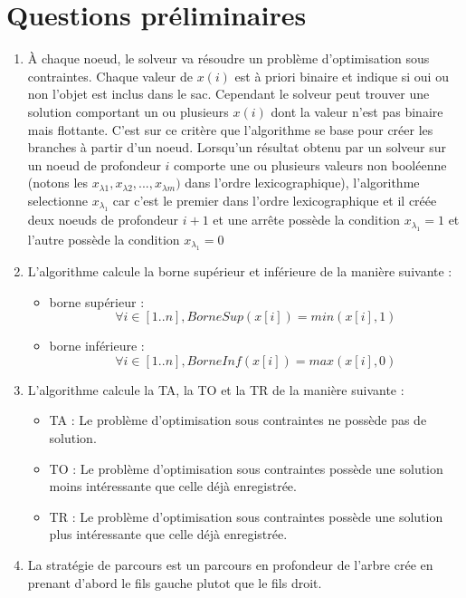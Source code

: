 \section {Questions préliminaires}
\begin{enumerate}
    \item
          À chaque noeud, le solveur va résoudre un problème d'optimisation sous contraintes.
          Chaque valeur de  $x(i)$ est à priori binaire et indique si oui ou non l'objet est inclus dans le sac.
          Cependant le solveur peut trouver une solution comportant un ou plusieurs $x(i)$ dont la valeur n'est pas binaire mais flottante.
          C'est sur ce critère que l'algorithme se base pour créer les branches à partir d'un noeud.
          Lorsqu'un résultat obtenu par un solveur sur un noeud de profondeur $i$ comporte une ou plusieurs valeurs non booléenne (notons les $x_{\lambda1},x_{\lambda2},...,x_{\lambda m})$ dans l'ordre lexicographique),
          l'algorithme selectionne $x_{\lambda_1}$ car c'est le premier dans l'ordre lexicographique et
          il créée deux noeuds de profondeur $i+1$ et une arrête possède la condition  $x_{\lambda_1} = 1$ et l'autre possède la condition $x_{\lambda_1} = 0$

    \item
          L'algorithme calcule la borne supérieur et inférieure de la manière suivante :

          \begin{itemize}
              \item borne supérieur :
                    $$ \forall i \in  [1..n], BorneSup(x[i]) = min(x[i],1)$$
              \item borne inférieure :
                    $$ \forall i \in  [1..n], BorneInf(x[i]) = max(x[i],0)$$
          \end{itemize}

    \item
          L'algorithme calcule la TA, la TO et la TR de la manière suivante :

          \begin{itemize}
              \item TA : Le problème d'optimisation sous contraintes ne possède pas de solution.
              \item TO : Le problème d'optimisation sous contraintes possède une solution moins intéressante que celle déjà enregistrée.
              \item TR : Le problème d'optimisation sous contraintes possède une solution plus intéressante que celle déjà enregistrée.
          \end{itemize}



    \item La stratégie de parcours est un parcours en profondeur de l'arbre crée en prenant d'abord le fils gauche plutot que le fils droit.

\end{enumerate}
